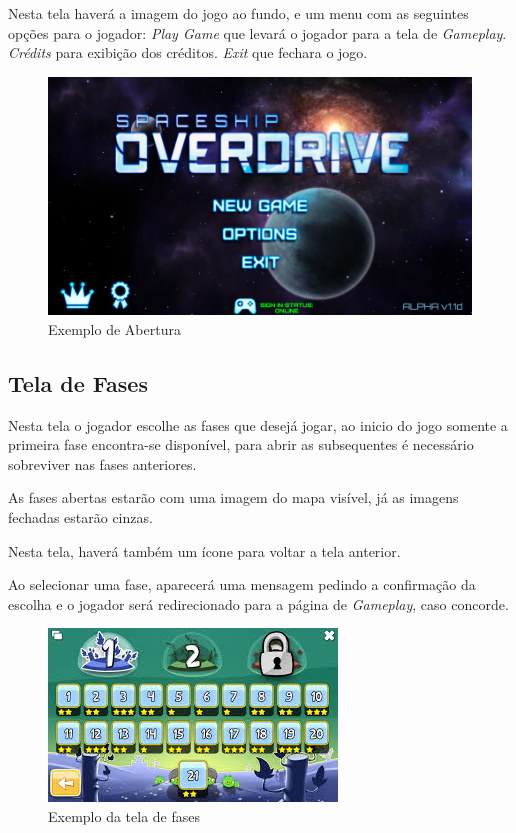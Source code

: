 \documentclass[11pt]{article} %
\begin{document}
Nesta tela haverá a imagem do jogo ao fundo, e um menu com as seguintes opções para o jogador: 
\textit{Play Game} que levará o jogador para a tela de \textit{Gameplay}.
\textit{Crédits} para exibição dos créditos.
\textit{Exit} que fechara o jogo.

\begin{figure}[!htp]
\centering
\includegraphics[scale=0.4]{res/abertura.png}
\caption{Exemplo de Abertura}
\label{Abertura}
\end{figure}

\subsection{Tela de Fases}
Nesta tela o jogador escolhe as fases que desejá jogar, ao inicio do jogo somente a primeira fase encontra-se disponível, para abrir as subsequentes é necessário sobreviver nas fases anteriores.

As fases abertas estarão com uma imagem do mapa visível, já as imagens fechadas estarão cinzas.

Nesta tela, haverá também um ícone para voltar a tela anterior.  

Ao selecionar uma fase, aparecerá uma mensagem pedindo a confirmação da escolha e o jogador será redirecionado para a página de \textit{Gameplay}, caso concorde.

\begin{figure}[!htp]
\centering
\includegraphics[scale=1]{res/fases.jpg}
\caption{Exemplo da tela de fases}
\label{Fases}
\end{figure}
\end{document}
